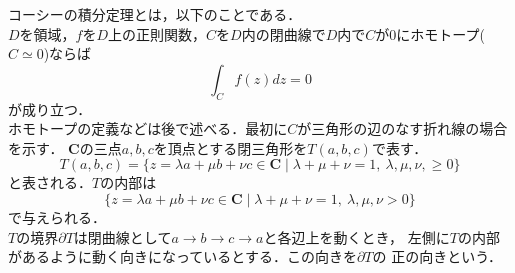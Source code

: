 
コーシーの積分定理とは，以下のことである．\\
$D$を領域，$f$を$D$上の正則関数，$C$を$D$内の閉曲線で$D$内で$C$が$0$にホモトープ($C\simeq 0$)ならば
\begin{equation}
  \int_{C}f(z)dz = 0
\end{equation}
が成り立つ．\\
ホモトープの定義などは後で述べる．最初に$C$が三角形の辺のなす折れ線の場合を示す．
$\mathbf{C}$の三点$a,b,c$を頂点とする閉三角形を$T(a,b,c)$で表す．
\begin{equation}
  T(a,b,c) = \{z = \lambda a + \mu b + \nu c \in \mathbf{C} \mid \lambda + \mu + \nu = 1,\ \lambda, \mu,\nu, \geq 0\}
\end{equation}
と表される．$T$の内部は
\begin{equation}
  \{z = \lambda a + \mu b + \nu c \in \mathbf{C} \mid \lambda + \mu + \nu = 1,\ \lambda, \mu, \nu > 0\}
\end{equation}
で与えられる．\\
$T$の境界$\partial T$は閉曲線として$a\to b \to c \to a$と各辺上を動くとき，
左側に$T$の内部があるように動く向きになっているとする．この向きを$\partial T$の
正の向きという．

